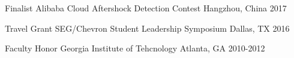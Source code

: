 \begin{cvhonors}

  \cvhonor
    {Finalist} %
    {Alibaba Cloud Aftershock Detection Contest} %
    {Hangzhou, China} %
    {2017} %

  \cvhonor
    {Travel Grant} %
    {SEG/Chevron Student Leadership Symposium} %
    {Dallas, TX} %
    {2016} %

  \cvhonor
    {Faculty Honor} %
    {Georgia Institute of Tehcnology} %
    {Atlanta, GA} %
    {2010-2012} %


\end{cvhonors}
